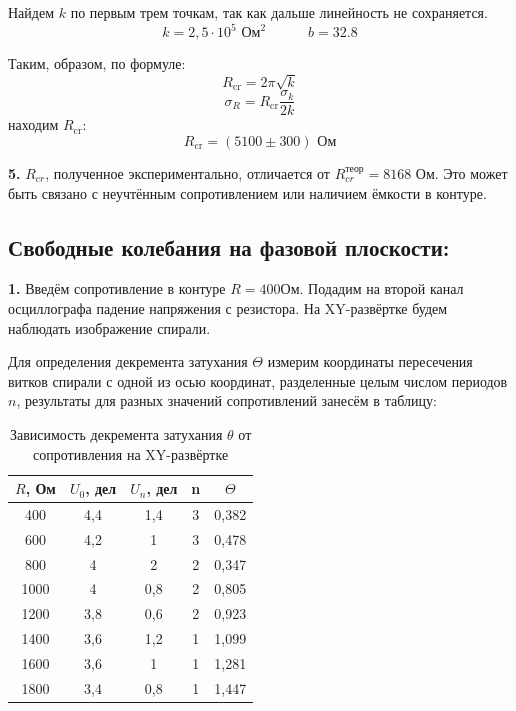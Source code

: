\documentclass[a4paper, 12pt]{article}
\newcommand{\te}[2]{{#1}_{\text{#2}}}
\begin{document}
Найдем $k$ по первым трем точкам, так как дальше линейность не сохраняется.
$$k = 2,5 \cdot 10^{5} \text{ Ом}^2 \quad\quad\quad b = 32.8$$	

Таким, образом, по формуле:
$$\te{R}{cr} = 2\pi\sqrt{k}$$
$$\sigma_R = \te{R}{cr} \frac{\sigma_k}{2k}$$
находим $\te{R}{cr}$: 
$$\te{R}{cr} = (5100 \pm 300) \text{ Ом}$$

\textbf{5.} $R_{cr}$, полученное экспериментально, отличается от $R_{cr}^\text{теор} = 8168$ Ом. Это может быть связано с неучтённым сопротивлением или наличием ёмкости в контуре.

\subsection{Свободные колебания на фазовой плоскости:}

\textbf{1.} Введём сопротивление в контуре $R = 400 Ом$. Подадим на второй канал осциллографа падение напряжения с резистора. На XY-развёртке будем наблюдать изображение спирали.


Для определения декремента затухания $\Theta$ измерим координаты пересечения витков спирали с одной из осью координат, разделенные целым числом периодов $n$, результаты для разных значений сопротивлений занесём в таблицу:

\begin{table}[H]
\centering
\caption{Зависимость декремента затухания $\theta$ от сопротивления на XY-развёртке}
\vspace{0.3cm}
\label{tab:3}
\begin{tabular}{|c|c|c|c|c|}
\hline
$R$, Ом & $U_0$, дел & $U_n$, дел & n & $\Theta$ \\ \hline
400     & 4,4        & 1,4        & 3 & 0,382   \\ \hline
600     & 4,2        & 1          & 3 & 0,478   \\ \hline
800     & 4          & 2          & 2 & 0,347   \\ \hline
1000    & 4          & 0,8        & 2 & 0,805   \\ \hline
1200    & 3,8        & 0,6        & 2 & 0,923   \\ \hline
1400    & 3,6        & 1,2        & 1 & 1,099   \\ \hline
1600    & 3,6        & 1          & 1 & 1,281   \\ \hline
1800    & 3,4        & 0,8        & 1 & 1,447   \\ \hline
\end{tabular}
\end{table}
\end{document}
